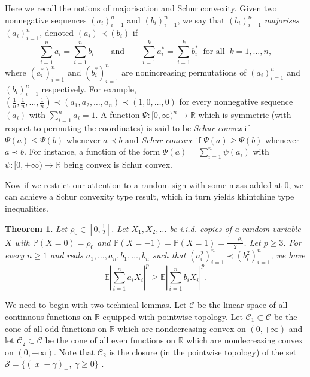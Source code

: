\documentclass[10pt]{article}
\newcommand{\E}{\mathbb{E}}
\newcommand{\1}{\textbf{1}}
\newcommand{\R}{\mathbb{R}}
\newcommand{\p}[1]{\mathbb{P}\left( #1 \right)}
\newtheorem{theorem}{Theorem}[subsection]
\theoremstyle{remark}
\theoremstyle{definition}
\begin{document}
 Here we recall the notions of majorisation and Schur convexity. Given two nonnegative sequences $(a_i)_{i=1}^n$ and $(b_i)_{i=1}^n$, we say that $(b_i)_{i=1}^n$ \emph{majorises} $(a_i)_{i=1}^n$, denoted $(a_i) \prec (b_i)$ if
\[
\sum_{i=1}^n a_i = \sum_{i=1}^n b_i \qquad \text{and} \qquad \sum_{i=1}^k a_i^* = \sum_{i=1}^k b_i^* \ \text{ for all } \ k = 1,\ldots,n,
\]
where $(a_i^*)_{i=1}^n$ and $(b_i^*)_{i=1}^n$ are nonincreasing permutations of $(a_i)_{i=1}^n$ and $(b_i)_{i=1}^n$ respectively. For example, $(\frac{1}{n},\frac{1}{n},\dots,\frac{1}{n}) \prec (a_1,a_2,\dots,a_n) \prec (1,0,\dots,0)$ for every nonnegative sequence $(a_i)$ with $\sum_{i=1}^n a_i = 1$. A function $\Psi\colon [0,\infty)^n \to \R$ which is symmetric (with respect to permuting the coordinates) is said to be \emph{Schur convex} if $\Psi(a) \leq \Psi(b)$ whenever $a \prec b$ and \emph{Schur-concave} if $\Psi(a) \geq \Psi(b)$ whenever $a \prec b$. For instance, a function of the form $\Psi(a) = \sum_{i=1}^n \psi(a_i)$ with $\psi\colon [0,+\infty) \to \R$ being convex is Schur convex.

Now if we restrict our attention to a random sign with some mass added at 0, we can achieve a Schur convexity type result, which in turn yields khintchine type inequalities.

\begin{theorem}\label{thm:Schur}
Let $\rho_0 \in [0,\frac{1}{2}]$. Let $X_1,X_2,\ldots$ be i.i.d. copies of a random variable $X$ with $\p{X = 0} = \rho_0$ and $\p{X = -1} = \p{X = 1} = \frac{1-\rho_0}{2}$. Let $p \geq 3$. For every $n \geq 1$ and reals $a_1,\ldots,a_n, b_1, \ldots, b_n$ such that $(a_i^2)_{i=1}^n \prec (b_i^2)_{i=1}^n$, we have
\begin{equation}\label{eq:Schur}
\E\left|\sum_{i=1}^n a_iX_i \right|^p \geq \E\left|\sum_{i=1}^n b_iX_i \right|^p.
\end{equation}
\end{theorem}

We need to begin with two technical lemmas. Let $\mathcal{C}$ be the linear space of all continuous functions on $\R$ equipped with pointwise topology. Let $\mathcal{C}_{1} \subset \mathcal{C}$ be the cone of all odd functions on $\R$ which are nondecreasing convex on $(0,+\infty)$ and let $\mathcal{C}_{2} \subset \mathcal{C}$ be the cone of all even functions on $\R$ which are nondecreasing convex on $(0,+\infty)$. Note that $\mathcal{C}_{2}$ is the closure (in the pointwise topology) of the set $\mathcal{S} = \{(|x|-\gamma)_+, \ \gamma \geq 0\}$ .
\end{document}
